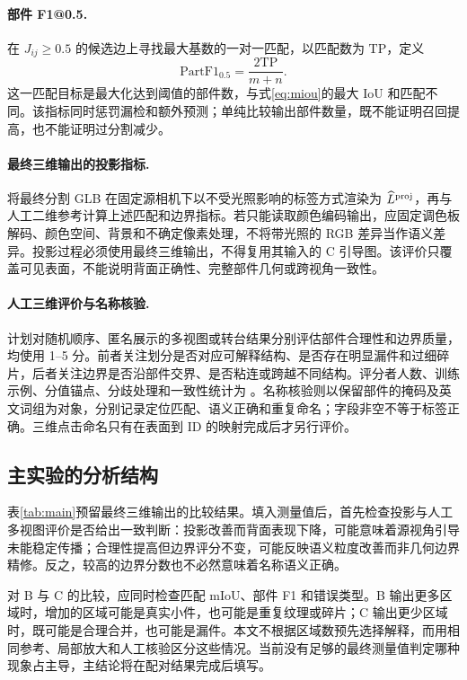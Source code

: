 \paragraph{部件 F1@0.5.}
在 $J_{ij}\geq0.5$ 的候选边上寻找最大基数的一对一匹配，以匹配数为 $\mathrm{TP}$，定义
\begin{equation}
 \mathrm{PartF1}_{0.5}=\frac{2\mathrm{TP}}{m+n}.
 \label{eq:partf1}
\end{equation}
这一匹配目标是最大化达到阈值的部件数，与式\eqref{eq:miou}的最大 IoU 和匹配不同。该指标同时惩罚漏检和额外预测；单纯比较输出部件数量，既不能证明召回提高，也不能证明过分割减少。

\paragraph{最终三维输出的投影指标.}
将最终分割 GLB 在固定源相机下以不受光照影响的标签方式渲染为 $\widehat L^{\rm proj}$，再与人工二维参考计算上述匹配和边界指标。若只能读取颜色编码输出，应固定调色板解码、颜色空间、背景和不确定像素处理，不将带光照的 RGB 差异当作语义差异。投影过程必须使用最终三维输出，不得复用其输入的 C 引导图。该评价只覆盖可见表面，不能说明背面正确性、完整部件几何或跨视角一致性。

\paragraph{人工三维评价与名称核验.}
计划对随机顺序、匿名展示的多视图或转台结果分别评估部件合理性和边界质量，均使用 1--5 分。前者关注划分是否对应可解释结构、是否存在明显漏件和过细碎片，后者关注边界是否沿部件交界、是否粘连或跨越不同结构。评分者人数、训练示例、分值锚点、分歧处理和一致性统计为 。名称核验则以保留部件的掩码及英文词组为对象，分别记录定位匹配、语义正确和重复命名；字段非空不等于标签正确。三维点击命名只有在表面到 ID 的映射完成后才另行评价。

\subsection{主实验的分析结构}
表\ref{tab:main}预留最终三维输出的比较结果。填入测量值后，首先检查投影与人工多视图评价是否给出一致判断：投影改善而背面表现下降，可能意味着源视角引导未能稳定传播；合理性提高但边界评分不变，可能反映语义粒度改善而非几何边界精修。反之，较高的边界分数也不必然意味着名称语义正确。

对 B 与 C 的比较，应同时检查匹配 mIoU、部件 F1 和错误类型。B 输出更多区域时，增加的区域可能是真实小件，也可能是重复纹理或碎片；C 输出更少区域时，既可能是合理合并，也可能是漏件。本文不根据区域数预先选择解释，而用相同参考、局部放大和人工核验区分这些情况。当前没有足够的最终测量值判定哪种现象占主导，主结论将在配对结果完成后填写。

